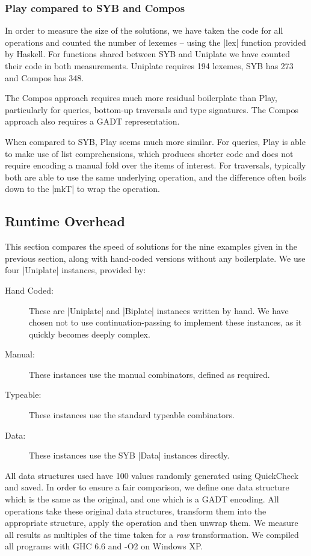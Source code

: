 \documentclass[preprint]{sigplanconf}
\begin{document}
\subsubsection{Play compared to SYB and Compos}

In order to measure the size of the solutions, we have taken the code for all operations and counted the number of lexemes -- using the |lex| function provided by Haskell. For functions shared between SYB and Uniplate we have counted their code in both measurements. Uniplate requires 194 lexemes, SYB has 273 and Compos has 348.

The Compos approach requires much more residual boilerplate than Play, particularly for queries, bottom-up traversals and type signatures. The Compos approach also requires a GADT representation.

When compared to SYB, Play seems much more similar. For queries, Play is able to make use of list comprehensions, which produces shorter code and does not require encoding a manual fold over the items of interest. For traversals, typically both are able to use the same underlying operation, and the difference often boils down to the |mkT| to wrap the operation.


\subsection{Runtime Overhead}
\label{sec:results_speed}

This section compares the speed of solutions for the nine examples given in the previous section, along with hand-coded versions without any boilerplate. We use four |Uniplate| instances, provided by:

\begin{description}
\item[Hand Coded:] These are |Uniplate| and |Biplate| instances written by hand. We have chosen not to use continuation-passing to implement these instances, as it quickly becomes deeply complex.
\item[Manual:] These instances use the manual combinators, defined as required.
\item[Typeable:] These instances use the standard typeable combinators.
\item[Data:] These instances use the SYB |Data| instances directly.
\end{description}

All data structures used have 100 values randomly generated using QuickCheck \citep{quickcheck} and saved. In order to ensure a fair comparison, we define one data structure which is the same as the original, and one which is a GADT encoding. All operations take these original data structures, transform them into the appropriate structure, apply the operation and then unwrap them. We measure all results as multiples of the time taken for a \textit{raw} transformation. We compiled all programs with GHC 6.6 and -O2 on Windows XP.
\end{document}
